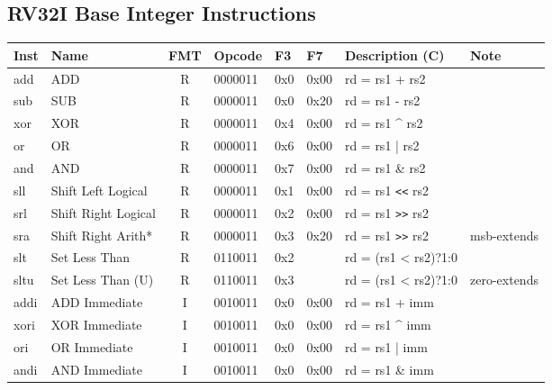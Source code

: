 \subsection*{RV32I Base Integer Instructions}

\begin{tabular}
{T | l | c | T | T | T | T | l} \hline
\rm Inst & Name                    & FMT & \rm Opcode & \rm F3 & \rm F7 & \rm Description (C)          & Note \\ \hline
add      & ADD                     & R   & 0000011    & 0x0    & 0x00   & rd = rs1 + rs2               & \\
sub      & SUB                     & R   & 0000011    & 0x0    & 0x20   & rd = rs1 - rs2               & \\
xor      & XOR                     & R   & 0000011    & 0x4    & 0x00   & rd = rs1 \^{} rs2            & \\
or       & OR                      & R   & 0000011    & 0x6    & 0x00   & rd = rs1 | rs2               & \\
and      & AND                     & R   & 0000011    & 0x7    & 0x00   & rd = rs1 \& rs2              & \\
sll      & Shift Left Logical      & R   & 0000011    & 0x1    & 0x00   & rd = rs1 \verb|<<| rs2       & \\
srl      & Shift Right Logical     & R   & 0000011    & 0x2    & 0x00   & rd = rs1 \verb|>>| rs2       & \\
sra      & Shift Right Arith*      & R   & 0000011    & 0x3    & 0x20   & rd = rs1 \verb|>>| rs2       & msb-extends \\
slt      & Set Less Than           & R   & 0110011    & 0x2    &        & rd = (rs1 < rs2)?1:0         & \\
sltu     & Set Less Than (U)       & R   & 0110011    & 0x3    &        & rd = (rs1 < rs2)?1:0         & zero-extends \\ \hline
addi     & ADD Immediate           & I   & 0010011    & 0x0    & 0x00   & rd = rs1 + imm               & \\
xori     & XOR Immediate           & I   & 0010011    & 0x0    & 0x00   & rd = rs1 \^{} imm            & \\
ori      & OR Immediate            & I   & 0010011    & 0x0    & 0x00   & rd = rs1 | imm               & \\
andi     & AND Immediate           & I   & 0010011    & 0x0    & 0x00   & rd = rs1 \& imm              & \\

\end{tabular}
